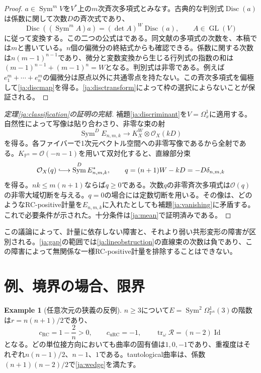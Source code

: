 \documentclass[12pt]{amsart}
\theoremstyle{definition}
\newtheorem{eg}[thm]{Example}
\theoremstyle{remark}
\numberwithin{equation}{section}
\newcommand{\GL}{\operatorname{GL}}
\DeclareMathOperator{\tr}{tr}
\DeclareMathOperator{\Id}{Id}
\DeclareMathOperator{\Sym}{Sym}
\DeclareMathOperator{\Disc}{Disc}
\newcommand{\urc}{\mathrm{uRC}}
\newcommand{\rc}{\mathrm{RC}}
\newcommand{\E}{E_{n,m,k}}
\newcommand{\Pp}{\mathbb P}
\newcommand{\cst}{\delta_{n,m,k}}
\newcommand{\jref}[1]{\eqref{ja:#1}}
\begin{document}
\begin{proof}
$a\in\Sym^m V$を$V^*$上の$m$次斉次多項式とみなす。古典的な判別式$\Disc(a)$は係数に関して次数$D$の斉次式であり、
\begin{equation}\label{ja:disctransform}
\Disc((\Sym^m A)a)=(\det A)^W\Disc(a),\qquad A\in\GL(V)
\end{equation}
に従って変換する。この二つの公式は\cite[Propositions~4.7(i) and~4.13]{ja:BJ}である。同文献の多項式の次数を、本稿では$m$と書いている。$n$個の偏微分の終結式からも確認できる。係数に関する次数は$n(m-1)^{n-1}$であり、微分と変数変換から生じる行列式の指数の和は$(m-1)^{n-1}+(m-1)^n=W$となる。判別式は非零である。例えば$e_1^m+\cdots+e_n^m$の偏微分は原点以外に共通零点を持たない。この斉次多項式を偏極して\jref{discmap}を得る。\jref{disctransform}によって枠の選択によらないことが保証される。
\end{proof}

\begin{proof}[定理\ref{ja:classification}の証明の完結]
補題\ref{ja:discriminant}を$V=\Omega_x^1$に適用する。自然性によって写像は貼り合わさり、非零な束の射
\begin{equation}\label{ja:bundlemap}
\Sym^D\E\longrightarrow K_X^W\otimes\mathcal O_X(kD)
\end{equation}
を得る。各ファイバーで1次元ベクトル空間への非零写像であるから全射である。$K_{\Pp^n}=\mathcal O(-n-1)$を用いて双対化すると、直線部分束
\begin{equation}\label{ja:lineobstruction}
\mathcal O_X(q)\lhook\joinrel\longrightarrow\Sym^D\E^*,\qquad
q=(n+1)W-kD=-D\cst
\end{equation}
を得る。$nk\le m(n+1)$ならば$q\ge0$である。次数$q$の非零斉次多項式は$\mathcal O(q)$の非零大域切断を与える。$q=0$の場合には定数切断を用いる。その像は、どのようなRC-positive計量を$\E$に入れたとしても補題\ref{ja:vanishing}に矛盾する。これで必要条件が示された。十分条件は\jref{mean}で証明済みである。
\end{proof}

この議論によって、計量に依存しない障害と、それより弱い共形変形の障害が区別される。\jref{gap}の範囲では\jref{lineobstruction}の直線束の次数は負であり、この障害によって無関係な一様RC-positive計量を排除することはできない。

\section{例、境界の場合、限界}

\begin{eg}[任意次元の狭義の反例]\label{ja:example}
$n\ge3$について$E=\Sym^2\Omega^1_{\Pp^n}(3)$の階数は$r=n(n+1)/2$であり、
\[
c_{\rc}=1-\frac2n>0,\qquad c_{\urc}=-1,\qquad
\tr_\omega\mathcal R=(n-2)\Id
\]
となる。どの単位接方向においても曲率の固有値は$1,0,-1$であり、重複度はそれぞれ$n(n-1)/2$、$n-1$、$1$である。tautological曲率は、係数$(n+1)(n-2)/2$で\jref{wedge}を満たす。
\end{eg}
\end{document}

